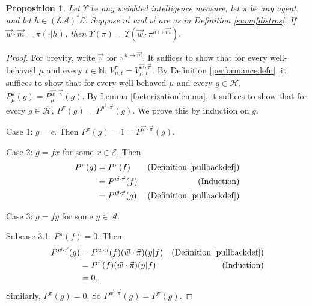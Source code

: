 \documentclass[twoside]{article}
\newtheorem{proposition}[theorem]{Proposition}
\begin{document}
\begin{proposition}
\label{longproposition}
    Let $\Upsilon$ be any weighted intelligence measure, let $\pi$ be any agent,
    and let $h\in(\mathcal E\mathcal A)^*\mathcal E$.
    Suppose $\vec m$ and $\vec w$ are as in Definition \ref{sumofdistros}.
    If $\vec w\cdot\vec m = \pi(\cdot|h)$, then
    $
        \Upsilon(\pi)
        =
        \Upsilon(\vec w\cdot \pi^{h\mapsto \vec m}).
    $
\end{proposition}

\begin{proof}
    For brevity, write $\vec\pi$ for $\pi^{h\mapsto \vec m}$. It suffices to
    show that for every well-behaved $\mu$ and every $t\in\mathbb N$,
    $
        V^{\pi}_{\mu,t}
        =
        V^{\vec w\cdot \vec\pi}_{\mu,t}.
    $
    By Definition \ref{performancedefn}, it suffices to show that for every
    well-behaved $\mu$ and every $g\in\mathcal H$,
    $
    P^\pi_\mu(g)
    =
    P^{\vec w\cdot\vec\pi}_\mu(g)
    $.
    By Lemma \ref{factorizationlemma}, it suffices
    to show that for every $g\in\mathcal H$,
    $P^\pi(g)=P^{\vec w\cdot\vec\pi}(g)$.
    We prove this by induction on $g$.

    Case 1: $g=\epsilon$.
    Then $P^\pi(g)=1
    =P^{\vec w\cdot\vec\pi}(g)$.

    Case 2: $g=fx$ for some $x\in\mathcal E$.
    Then
    \begin{align*}
        P^\pi(g)
            &= P^\pi(f)
                &\mbox{(Definition \ref{pullbackdef})}\\
            &= P^{\vec w\cdot\vec\pi}(f)
                &\mbox{(Induction)}\\
            &= P^{\vec w\cdot\vec\pi}(g).
                &\mbox{(Definition \ref{pullbackdef})}
    \end{align*}

    Case 3: $g=fy$ for some $y\in\mathcal A$.

    Subcase 3.1: $P^\pi(f)=0$.
    Then
    \begin{align*}
        P^{\vec w\cdot\vec\pi}(g)
            &= P^{\vec w\cdot\vec\pi}(f)
            (\vec w\cdot\vec\pi)(y|f)
                &\mbox{(Definition \ref{pullbackdef})}\\
            &= P^\pi(f)(\vec w\cdot\vec\pi)(y|f)
                &\mbox{(Induction)}\\
            &= 0.
    \end{align*}
    Similarly, $P^\pi(g)=0$. So $P^{\vec w\cdot\vec\pi}(g)=P^\pi(g)$.


\end{proof}
\end{document}
